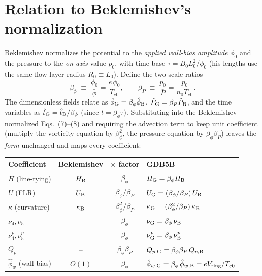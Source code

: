 \documentclass[11pt]{article}
\begin{document}
\section{Relation to Beklemishev's normalization}
\label{sec:bek}

Beklemishev normalizes the potential to the \emph{applied wall-bias amplitude}
$\phi_0$ and the pressure to the \emph{on-axis} value $p_0$, with time base
$\tau=B_0 L_0^2/\phi_0$ (his lengths use the same flow-layer radius
$R_0\!\equiv\!L_0$). Define the two scale ratios
\begin{equation}
  \beta_\phi \;\equiv\; \frac{\phi_0}{\bar\phi} = \frac{e\,\phi_0}{T_{e0}},
  \qquad
  \beta_P \;\equiv\; \frac{p_0}{\bar P} = \frac{p_0}{n_0 T_{e0}} .
\end{equation}
The dimensionless fields relate as $\hat\phi_{\rm G}=\beta_\phi\hat\phi_{\rm B}$,
$\hat P_{\rm G}=\beta_P\hat P_{\rm B}$, and the time variables as
$\hat t_{\rm G}=\hat t_{\rm B}/\beta_\phi$ (since $\bar t=\beta_\phi\tau$).
Substituting into the Beklemishev-normalized Eqs.~(7)--(8) and requiring the
advection term to keep unit coefficient (multiply the vorticity equation by
$\beta_\phi^2$, the pressure equation by $\beta_\phi\beta_P$) leaves the
\emph{form} unchanged and maps every coefficient:
\begin{center}
\begin{tabular}{lccl}
\toprule
Coefficient & Beklemishev & $\times$ factor & GDB5B\\
\midrule
$H$   (line-tying)      & $H_{\rm B}$      & $\beta_\phi$              & $H_{\rm G}=\beta_\phi H_{\rm B}$\\
$U$   (FLR)             & $U_{\rm B}$      & $\beta_\phi/\beta_P$      & $U_{\rm G}=(\beta_\phi/\beta_P)\,U_{\rm B}$\\
$\kappa$ (curvature)    & $\kappa_{\rm B}$ & $\beta_\phi^2/\beta_P$    & $\kappa_{\rm G}=(\beta_\phi^2/\beta_P)\,\kappa_{\rm B}$\\
$\nu_4,\nu_5$           & --               & $\beta_\phi$              & $\nu_{\rm G}=\beta_\phi\,\nu_{\rm B}$\\
$\nu_4^p,\nu_5^p$       & --               & $\beta_\phi$              & $\nu^p_{\rm G}=\beta_\phi\,\nu^p_{\rm B}$\\
$Q_p$                   & --               & $\beta_\phi\beta_P$       & $Q_{p,\rm G}=\beta_\phi\beta_P\,Q_{p,\rm B}$\\
$\hat\phi_w$ (wall bias)& $O(1)$           & $\beta_\phi$              & $\hat\phi_{w,\rm G}=\beta_\phi\,\hat\phi_{w,\rm B}=eV_{\rm ring}/T_{e0}$\\
\bottomrule
\end{tabular}
\end{center}
\end{document}
